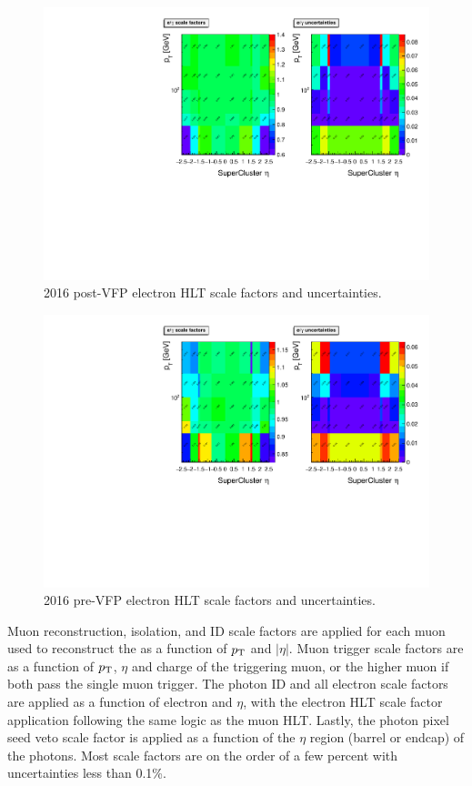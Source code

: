 \begin{figure}[htb!]
	\centering
	\includegraphics[width=0.85\linewidth]{figs/05_analysis/UL2016_postVFP_SF2D_myWP.pdf}
	\caption[2016 post-VFP electron HLT scale factors and uncertainties.]{2016 post-VFP electron HLT scale factors and uncertainties.}
	\label{fig:UL2016_postVFP_SF2D}
\end{figure}

\begin{figure}[htb!]
	\centering
	\includegraphics[width=0.85\linewidth]{figs/05_analysis/UL2016_preVFP_SF2D_myWP.pdf}
	\caption[2016 pre-VFP electron HLT scale factors and uncertainties.]{2016 pre-VFP electron HLT scale factors and uncertainties.}
	\label{fig:UL2016_preVFP_SF2D}
\end{figure}

Muon reconstruction, isolation, and ID scale factors are applied for each muon used to reconstruct the \PZ as a function of $p_{\mathrm{T}}$ and $|\eta|$. Muon trigger scale factors are as a function of $p_{\mathrm{T}}$, $\eta$ and charge of the triggering muon, or the higher \pt muon if both pass the single muon trigger. The photon ID and all electron scale factors are applied as a function of electron \pt and $\eta$, with the electron HLT scale factor application following the same logic as the muon HLT. Lastly, the photon pixel seed veto scale factor is applied as a function of the $\eta$ region (barrel or endcap) of the photons. Most scale factors are on the order of a few percent with uncertainties less than 0.1\%.


